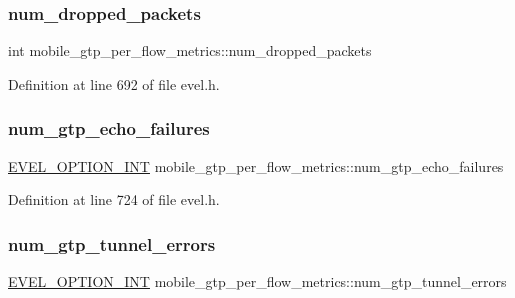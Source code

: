 \subsubsection{\texorpdfstring{num\+\_\+dropped\+\_\+packets}{num\_dropped\_packets}}
{\footnotesize\ttfamily int mobile\+\_\+gtp\+\_\+per\+\_\+flow\+\_\+metrics\+::num\+\_\+dropped\+\_\+packets}



Definition at line 692 of file evel.\+h.

\hypertarget{structmobile__gtp__per__flow__metrics_a5996ce5c1dd8fe7f5c595d648ece877e}{}\label{structmobile__gtp__per__flow__metrics_a5996ce5c1dd8fe7f5c595d648ece877e} 
\subsubsection{\texorpdfstring{num\+\_\+gtp\+\_\+echo\+\_\+failures}{num\_gtp\_echo\_failures}}
{\footnotesize\ttfamily \hyperlink{evel_8h_a452d825778d1c2368a54b8f689a25ba7}{E\+V\+E\+L\+\_\+\+O\+P\+T\+I\+O\+N\+\_\+\+I\+NT} mobile\+\_\+gtp\+\_\+per\+\_\+flow\+\_\+metrics\+::num\+\_\+gtp\+\_\+echo\+\_\+failures}



Definition at line 724 of file evel.\+h.

\hypertarget{structmobile__gtp__per__flow__metrics_ab233758fc0f8f3f1c33ac6d2dcbf5709}{}\label{structmobile__gtp__per__flow__metrics_ab233758fc0f8f3f1c33ac6d2dcbf5709} 
\subsubsection{\texorpdfstring{num\+\_\+gtp\+\_\+tunnel\+\_\+errors}{num\_gtp\_tunnel\_errors}}
{\footnotesize\ttfamily \hyperlink{evel_8h_a452d825778d1c2368a54b8f689a25ba7}{E\+V\+E\+L\+\_\+\+O\+P\+T\+I\+O\+N\+\_\+\+I\+NT} mobile\+\_\+gtp\+\_\+per\+\_\+flow\+\_\+metrics\+::num\+\_\+gtp\+\_\+tunnel\+\_\+errors}



